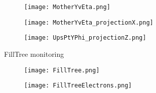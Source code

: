 \documentclass{beamer}
\begin{document}
\begin{frame}
  \begin{figure}[h!]
  \centering
  \texttt{[image: MotherYvEta.png]}
  \end{figure}
\end{frame}

\begin{frame}
  \begin{figure}[h!]
  \centering
  \texttt{[image: MotherYvEta\_projectionX.png]}
  \end{figure}
\end{frame}

\begin{frame}
  \begin{figure}[h!]
  \centering
  \texttt{[image: UpsPtYPhi\_projectionZ.png]}
  \end{figure}
\end{frame}

\begin{frame}
  \begin{center}
 	\Huge FillTree monitoring
 	\end{center}
\end{frame}

\begin{frame}
  \begin{figure}[h!]
  \centering
  \texttt{[image: FillTree.png]}
  \end{figure}
\end{frame}

\begin{frame}
  \begin{figure}[h!]
  \centering
  \texttt{[image: FillTreeElectrons.png]}
  \end{figure}
\end{frame}



\end{document}
